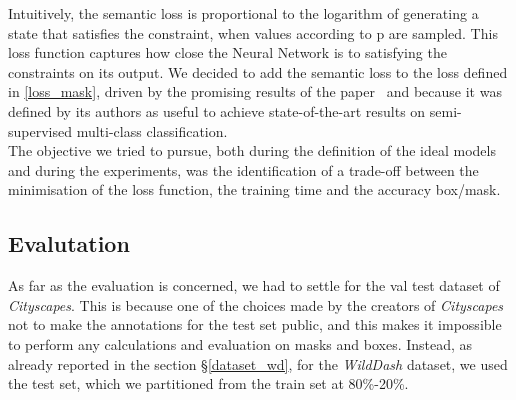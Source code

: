 \documentclass[10pt,twocolumn,letterpaper]{article}
\begin{document}
\noindent
Intuitively, the semantic loss is proportional to the logarithm of generating a state that satisfies the constraint, when values according to p are sampled. This loss function captures how close the Neural Network is to satisfying the constraints on its output. We decided to add the semantic loss to the loss defined in \ref{loss_mask}, driven by the promising results of the paper~\cite{Authors2_BlendMask} and because it was defined by its authors as useful to achieve state-of-the-art results on semi-supervised multi-class classification. \\
The objective we tried to pursue, both during the definition of the ideal models and during the experiments, was the identification of a trade-off between the minimisation of the loss function, the training time and the accuracy box/mask.
\subsection{Evalutation}
As far as the evaluation is concerned, we had to settle for the val test dataset of \textit{Cityscapes}. 
This is because one of the choices made by the creators of \textit{Cityscapes}~\cite{cityscapes} not to make the annotations for the test set public, and this makes it impossible to perform any calculations and evaluation on masks and boxes. Instead, as already reported in the section  \S\ref{dataset_wd}, for the \textit{WildDash} dataset, we used the test set, which we partitioned from the train set at 80\%-20\%.
\end{document}
